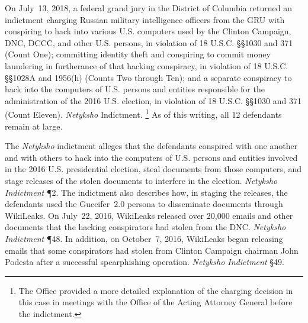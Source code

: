 On July~13, 2018, a federal grand jury in the District of Columbia returned an indictment charging Russian military intelligence officers from the GRU with conspiring to hack into various U.S. computers used by the Clinton Campaign, DNC, DCCC, and other U.S. persons, in violation of 18 U.S.C. \S\S 1030 and 371 (Count One); committing identity theft and conspiring to commit money laundering in furtherance of that hacking conspiracy, in violation of 18 U.S.C. \S\S 1028A and 1956(h) (Counts Two through Ten); and a separate conspiracy to hack into the computers of U.S. persons and entities responsible for the administration of the 2016 U.S. election, in violation of 18 U.S.C. \S\S 1030 and 371 (Count Eleven).
\textit{Netyksho} Indictment.%
\footnote{The Office provided a more detailed explanation of the charging decision in this case in meetings with the Office of the Acting Attorney General before the indictment.}
As of this writing, all 12 defendants remain at large.

The \textit{Netyksho} indictment alleges that the defendants conspired with one another and with others to hack into the computers of U.S. persons and entities involved in the 2016 U.S. presidential election, steal documents from those computers, and stage releases of the stolen documents to interfere in the election.
\textit{Netyksho Indictment} \P 2.
The indictment also describes how, in staging the releases, the defendants used the Guccifer~2.0 persona to disseminate documents through WikiLeaks.
On July~22, 2016, WikiLeaks released over 20,000 emails and other documents that the hacking conspirators had stolen from the DNC\null.
\textit{Netyksho Indictment} \P 48.
In addition, on October~7, 2016, WikiLeaks began releasing emails that some conspirators had stolen from Clinton Campaign chairman John Podesta after a successful spearphishing operation.
\textit{Netyksho Indictment} \S 49.




